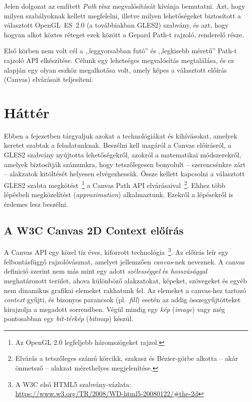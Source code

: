 \documentclass[12pt]{report}
\theoremstyle{definition}
\newcommand{\inenglish}[1]{\textsl{#1}}
\begin{document}
  Jelen dolgozat az említett \emph{Path} rész megvalósítását kívánja bemutatni.
Azt, hogy milyen szabályoknak kellett megfelelni, illetve milyen lehetőségeket
biztosított a választott OpenGL~ES~2.0 (a továbbiakban GLES2) szabvány, és azt,
hogy hogyan alkot köztes réteget ezek között a Gepard Path-t rajzoló, renderelő
része.

  Első körben nem volt cél a ,,leggyorsabban futó'' és ,,legkisebb méretű''
Path-t rajzoló API elkészítése. Célunk egy lehetséges megvalósítás megtalálása,
és ez alapján egy olyan eszköz megalkotása volt, amely képes a választott
előírás (Canvas) elvárásait teljesíteni.



    \chapter{Háttér}
    \label{Háttér}

  Ebben a fejezetben tárgyaljuk azokat a technológiákat és kihívásokat,
amelyek keretet szabtak a feladatunknak. Beszélni kell magáról a Canvas
előírásról, a GLES2 szabvány nyújtotta lehetőségekről, azokról a matematikai
módszerekről, amelyek biztosítják számunkra, hogy tetszőlegesen bonyolult --
szerencsénkre zárt -- alakzatok kitöltését helyesen elvégezhessük. Össze
kellett kapcsolni a választott GLES2 szabta megkötést~\footnote { Az OpenGL 2.0
legfeljebb háromszögeket rajzol. } a Canvas Path API elvárásaival~\footnote {
Elvárás a tetszőleges számú körcikk, szakasz és Bézier-görbe alkotta -- akár
önmetsző -- alakzat mérethelyes megjelenítése. }. Ehhez több lépésbeli
megközelítést (\inenglish{approximation}) alkalmaztunk. Ezekről a lépésekről is
érdemes lesz beszélni.

    \section[A Canvas előírás]{A W3C Canvas 2D Context előírás}
    \label{A Canvas előírás}

  A Canvas API egy közel tíz éves, kiforrott technológia~\footnote {A W3C első
HTML5 szabvány-vázlata:\\ \footnotesize{
\url{https://www.w3.org/TR/2008/WD-html5-20080122/\#the-2d}} }. Az előírás leír
egy felbontásfüggő rajzolóvásznat, amelyet jellemzően \emph{canvas}-nek
neveznek. A canvas definició szerint nem más mint egy adott \emph{szélességgel}
és \emph{hosszúsággal} meghatározott terület, ahova különböző alakzatokat,
képeket, szövegeket és egyéb nem dinamikus grafikai elemeket rakhatunk fel. Az
elemeket a canvas-hez tartozó \emph{context} gyűjti, és bizonyos parancsok
(pl.~\emph{fill}) esetén az addig összegyűjtötteket kirajzolja a megadott
sorrendben. Végül mindig egy \emph{kép} (\inenglish{image}) vagy még
pontosabban egy \emph{bit-térkép} (\inenglish{bitmap}) készül.
\end{document}
